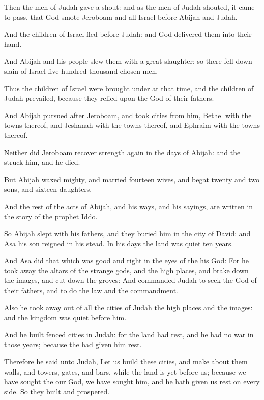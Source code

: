 \Verse Then the men of Judah gave a shout: and as the men of Judah shouted, it came to pass, that God smote Jeroboam and all Israel before Abijah and Judah.

\Verse And the children of Israel fled before Judah: and God delivered them into their hand.

\Verse And Abijah and his people slew them with a great slaughter: so there fell down slain of Israel five hundred thousand chosen men.

\Verse Thus the children of Israel were brought under at that time, and the children of Judah prevailed, because they relied upon the \LORD God of their fathers.

\Verse And Abijah pursued after Jeroboam, and took cities from him, Bethel with the towns thereof, and Jeshanah with the towns thereof, and Ephraim with the towns thereof.

\Verse Neither did Jeroboam recover strength again in the days of Abijah: and the \LORD struck him, and he died.

\Verse But Abijah waxed mighty, and married fourteen wives, and begat twenty and two sons, and sixteen daughters.

\Verse And the rest of the acts of Abijah, and his ways, and his sayings, are written in the story of the prophet Iddo.


\Chapter
\Verse So Abijah slept with his fathers, and they buried him in the city of David: and Asa his son reigned in his stead. In his days the land was quiet ten years.

\Verse And Asa did that which was good and right in the eyes of the \LORD his God: \Verse For he took away the altars of the strange gods, and the high places, and brake down the images, and cut down the groves: \Verse And commanded Judah to seek the \LORD God of their fathers, and to do the law and the commandment.

\Verse Also he took away out of all the cities of Judah the high places and the images: and the kingdom was quiet before him.

\Verse And he built fenced cities in Judah: for the land had rest, and he had no war in those years; because the \LORD had given him rest.

\Verse Therefore he said unto Judah, Let us build these cities, and make about them walls, and towers, gates, and bars, while the land is yet before us; because we have sought the \LORD our God, we have sought him, and he hath given us rest on every side. So they built and prospered.

